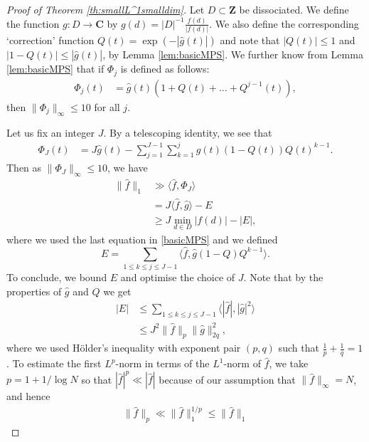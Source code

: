 \documentclass[11pt, reqno]{amsart}
\begin{document}
\begin{proof}[Proof of Theorem \ref{th:smallL^1smalldim}]
Let $D\subset\mathbf{Z}$ be dissociated. We define the function $g:D\to\mathbf{C}$ by $g(d)=|D|^{-1}\frac{f(d)}{|f(d)|}$. We also define the corresponding `correction' function $Q(t)=\exp(-|\hat{g}(t)|)$ and note that $|Q(t)|\leqslant 1$ and $|1-Q(t)|\leqslant |\hat{g}(t)|$, by Lemma \ref{lem:basicMPS}. We further know from Lemma \ref{lem:basicMPS} that if $\Phi_j$ is defined as follows:
\begin{align*}
    \Phi_{j}(t)&=\hat{g}(t)(1+Q(t)+\dots+Q^{j-1}(t)),
\end{align*}
then $\lVert \Phi_j\rVert_\infty\leqslant 10$ for all $j$.

\medskip

Let us fix an integer $J$. By a telescoping identity, we see that \begin{align*}\Phi_J(t)&=J\hat{g}(t)-\sum_{j=1}^{J-1}\sum_{k=1}^j\hat{g}(t)(1-Q(t))Q(t)^{k-1}.
\end{align*}Then as $\lVert \Phi_J\rVert_\infty\leqslant 10$, we have
\begin{align}
    \lVert \hat{f}\rVert_1&\gg \langle \hat{f},\Phi_J\rangle\nonumber\\
    &= J\langle \hat{f},\hat{g}\rangle-E\nonumber\\
    &\geqslant J\min_{d\in D}|f(d)|-|E|,\label{eq:JEbound}
\end{align}
where we used the last equation in \eqref{basicMPS} and we defined $$E=\sum_{1\leqslant k\leqslant j\leqslant J-1}\langle \hat{f},\hat{g}(1-Q)Q^{k-1}\rangle.$$ To conclude, we bound $E$ and optimise the choice of $J$. Note that by the properties of $\hat{g}$ and $Q$ we get
\begin{align}
    |E|&\leqslant \sum_{1\leqslant k\leqslant j\leqslant J-1}\langle |\hat{f}|,|\hat{g}|^2\rangle\nonumber\\
    &\leqslant J^2 \lVert \hat{f}\rVert_p\lVert \hat{g}\rVert_{2q}^2,\label{eq:Eupp}
\end{align}
where we used H\"older's inequality with exponent pair $(p,q)$ such that $\frac{1}{p}+\frac{1}{q}=1$. To estimate the first $L^p$-norm in terms of the $L^1$-norm of $\hat{f}$, we take $p=1+1/\log N$ so that $|\hat{f}|^p\ll |\hat{f}|$ because of our assumption that $\lVert \hat{f}\rVert_\infty =N$, and hence
\begin{align*}
    \lVert \hat{f}\rVert_p\ll \lVert \hat{f}\rVert_1^{1/p}\leqslant \lVert \hat{f}\lVert_1
\end{align*}

\end{proof}
\end{document}
